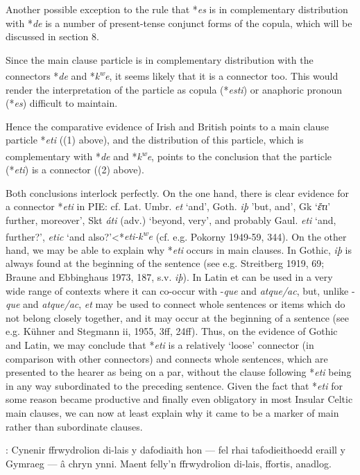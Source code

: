 Another possible exception to the rule that *\textit{es} is in complementary
distribution with *\textit{de} is a number of present-tense conjunct forms of the
copula, which will be discussed in section 8.

Since the main clause particle is in complementary distribution with the
connectors *\textit{de} and *\textit{k\textsuperscript{w}e}, it seems likely that it is a connector too. This
would render the interpretation of the particle as copula (*\textit{esti}) or
anaphoric pronoun (*\textit{es}) difficult to maintain.

Hence the comparative evidence of Irish and British points to a main
clause particle *\textit{eti} ((1) above), and the distribution of this particle, which
is complementary with *\textit{de} and *\textit{k\textsuperscript{w}e}, points to the conclusion that the
particle (*\textit{eti}) is a connector ((2) above).

Both conclusions interlock perfectly. On the one hand, there is clear
evidence for a connector *\textit{eti} in PIE: cf. Lat. Umbr. \textit{et} `and', Goth. \textit{iþ}
'but, and', Gk `\textit{ἔτι}' further, moreover', Skt \textit{áti} (adv.) `beyond, very', and
probably Gaul. \textit{eti} `and, further?', \textit{etic} `and also?'<*\textit{eti-k\textsuperscript{w}e} (cf. e.g.
Pokorny 1949-59, 344). On the other hand, we may be able to explain
why *\textit{eti} occurs in main clauses. In Gothic, \textit{iþ} is always found at the
beginning of the sentence (see e.g. Streitberg 1919, 69; Braune and
Ebbinghaus 1973, 187, s.v. \textit{iþ}). In Latin et can be used in a very wide
range of contexts where it can co-occur with -\textit{que} and \textit{atque/ac}, but,
unlike -\textit{que} and \textit{atque/ac}, \textit{et} may be used to connect whole sentences or
items which do not belong closely together, and it may occur at the
beginning of a sentence (see e.g. Kühner and Stegmann ii, 1955, 3ff,
24ff). Thus, on the evidence of Gothic and Latin, we may conclude that
*\textit{eti }is a relatively `loose' connector (in comparison with other connectors)
and connects whole sentences, which are presented to the hearer as being
on a par, without the clause following *\textit{eti} being in any way subordinated
to the preceding sentence. Given the fact that *\textit{eti} for some reason
became productive and finally even obligatory in most Insular Celtic main
clauses, we can now at least explain why it came to be a marker of main
rather than subordinate clauses.


\textcite[37--38]{thomas_tafodiaith_1993}: Cynenir ffrwydrolion di-lais y dafodiaith hon --- fel rhai tafodieithoedd eraill y Gymraeg --- \^a chryn ynni. Maent felly'n ffrwydrolion di-lais, ffortis, anadlog.

